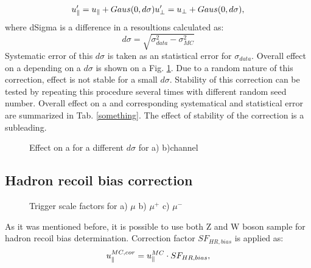\begin{equation}
u_{\parallel}' = u_{\parallel}+Gaus(0, d\sigma)
u_{\perp}' = u_{\perp} + Gaus(0, d\sigma),
\end{equation}
where dSigma is a difference in a resoultions calculated as:
\begin{equation}
d\sigma=\sqrt{\sigma_{data}^2-\sigma_{MC}^2}
\end{equation}
Systematic error of this $d\sigma$ is taken as an statistical error for $\sigma_{data}$. Overall effect on a \cw depending on a $d\sigma$ is shown on a Fig. \ref{ris:CwSmear}.
Due to a random nature of this correction, effect is not stable for a small $d\sigma$. Stability of this correction can be tested by repeating this procedure several times with different random seed number. Overall effect on a \cw and corresponding systematical and statistical error are summarized in Tab. \ref{something}. The effect of stability of the correction is a subleading. 
\begin{figure}[h]
\begin{minipage}[h]{0.49\linewidth}
\end{minipage}
\hfill
\begin{minipage}[h]{0.49\linewidth}
\end{minipage}
\caption{Effect on a \cw for a different $d\sigma$ for a) \wenu b)\wmunu channel}
\label{ris:CwSmear}
\end{figure}

\subsection{Hadron recoil bias correction}

\begin{figure}[!htb]
\endminipage\hfill
{}
\endminipage\hfill
{}%
\endminipage
\vfill
{}
\endminipage\hfill
{}
\endminipage\hfill
{}%
\endminipage
\caption{Trigger scale factors for a) $\mu$ b) $\mu^{+}$  c) $\mu^{-}$}
\label{fig:MuSF}
\end{figure}
As it was mentioned before, it is possible to use both Z and W boson sample for hadron recoil bias determination. Correction factor $SF_{HR,bias}$ is applied as:
\begin{equation}
u_{\parallel}^{MC,cor}=u_{\parallel}^{MC} \cdot SF_{HR,bias},
\end{equation}

